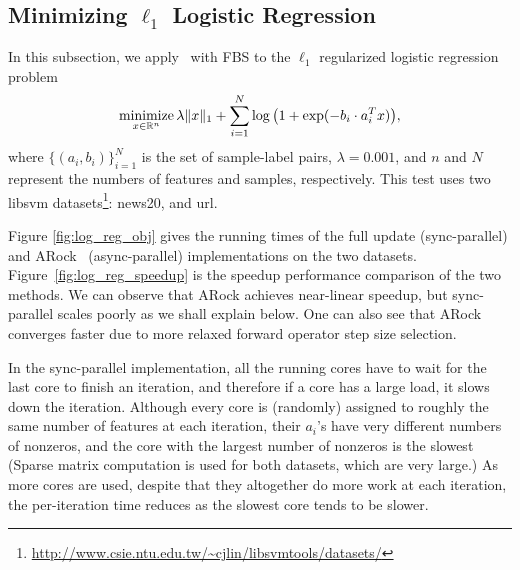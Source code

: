 \subsection{Minimizing $\ell_1$ Logistic Regression}
In this subsection, we apply \pkg~with FBS to the $\ell_1$ regularized logistic regression problem
\begin{equation}\label{eqn:l12_log}
\operatorname*{minimize}_{x \in \mathbb{R}^n} \lambda \|x\|_1 + \sum_{i=1}^N \log\big(1 + \exp(-b_i \cdot a_i^T x)\big),
\end{equation}
where $\{(a_i, b_i)\}_{i=1}^N$ is the set of sample-label pairs, $\lambda =0.001$, and $n$ and $N$ represent the numbers of features and samples, respectively. This test uses two libsvm datasets\footnote{\url{http://www.csie.ntu.edu.tw/~cjlin/libsvmtools/datasets/}}: news20, and url.

Figure \ref{fig:log_reg_obj} gives the running times of  the full update (sync-parallel) and ARock~ (async-parallel) implementations on the two datasets. Figure~\ref{fig:log_reg_speedup} is the speedup performance comparison of the two methods. We can observe that ARock achieves near-linear speedup, but sync-parallel scales poorly as we shall explain below. One can also see that ARock converges faster due to more relaxed forward operator step size selection. 

In the sync-parallel implementation,  all the running cores have to wait for the last core to finish an iteration, and therefore if a core has a large load, it slows down the iteration. Although every core is (randomly) assigned to roughly the same number of features at each iteration, their  $a_i$'s have very different numbers of nonzeros, and the core with the largest number of nonzeros is the slowest (Sparse matrix computation is used for both datasets, which are very large.) As more cores are used,  despite that they altogether do more work at each iteration, the per-iteration time reduces as the slowest core tends to be slower.


